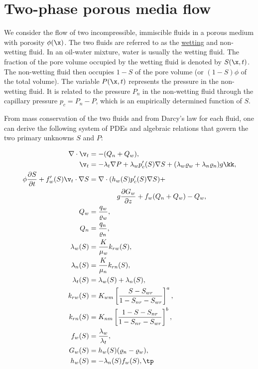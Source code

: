 \documentclass[graybox,envcountchap,sectrefs,final]{svmonodo}
\begin{document}
\section{Two-phase porous media flow}

We consider the flow of two incompressible, immiscible fluids in
a porous medium with porosity $\phi (\x)$. The two fluids are referred to
as the \href{{https://en.wikipedia.org/wiki/Wetting}}{wetting} and
non-wetting fluid. In an oil-water mixture, water is usually the
wetting fluid. The fraction of the pore volume occupied by the
wetting fluid is denoted by $S(\x,t)$. The non-wetting fluid then occupies
$1-S$ of the pore volume (or $(1-S)\phi$ of the total volume).
The variable $P(\x,t)$ represents the pressure in the non-wetting fluid.
It is related to the pressure $P_n$ in the non-wetting fluid through
the capillary pressure $p_c=P_n-P$, which is an empirically determined
function of $S$.

From mass conservation of the two fluids and from Darcy's law for
each fluid, one can derive the following system of PDEs and
algebraic relations that govern the two primary unknowns $S$ and $P$:

\begin{align}
\nabla\cdot\v_t &= -(Q_n + Q_w),
\label{scale:twoph:Peq}\\ 
\v_t &= -\lambda_t\nabla P + \lambda_wp_c'(S)\nabla S + (\lambda_w\varrho_w
+ \lambda_n\varrho_n)g\kk,
\label{scale:twoph:v_teq}\\ 
\phi\frac{\partial S}{\partial t} + f_w'(S)\v_t\cdot\nabla S &=
\nabla\cdot(h_w(S)p_c'(S)\nabla S) + \nonumber\\ 
&\qquad\qquad g\frac{\partial G_w}{\partial z} + f_w(Q_n+Q_w) - Q_w,
\label{scale:twoph:Seq}\\ 
Q_w &= \frac{q_w}{\varrho_w},
\label{scale:twoph:Q_w}\\ 
Q_n &= \frac{q_n}{\varrho_n},
\label{scale:twoph:Q_n}\\ 
\lambda_w(S) &= \frac{K}{\mu_w}k_{rw}(S),
\label{scale:twoph:lambda_w}\\ 
\lambda_n(S) &= \frac{K}{\mu_n}k_{rn}(S),
\label{scale:twoph:lambda_n}\\ 
\lambda_t(S) &= \lambda_w(S) + \lambda_n(S),
\label{scale:twoph:lambda_t}\\ 
k_{rw}(S) &= K_{wm}\left\lbrack\frac{S-S_{wr}}{1-S_{nr}-S_{wr}}\right\rbrack^a,
\label{scale:twoph:k_rw}\\ 
k_{rn}(S) &= K_{nm}\left\lbrack\frac{1-S-S_{nr}}{1-S_{nr}-S_{wr}}\right\rbrack^b,
\label{scale:twoph:k_rn}\\ 
f_w(S) &= \frac{\lambda_w}{\lambda_t},
\label{scale:twoph:f_w}\\ 
G_w(S) &= h_w(S)(\varrho_n - \varrho_w),
\label{scale:twoph:G_w}\\ 
h_w(S) &= -\lambda_n(S)f_w(S),
\label{scale:twoph:h_w}\tp
\end{align}
\end{document}
